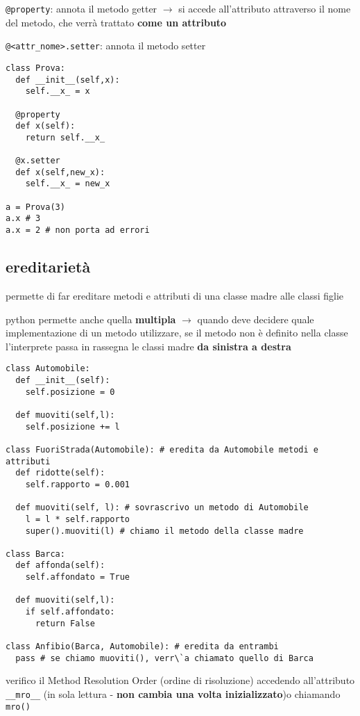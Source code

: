 \texttt{@property}: annota il metodo getter $\rightarrow$ si accede all'attributo attraverso il nome del metodo, che verr\`a trattato \textbf{come un attributo}

\texttt{@<attr_nome>.setter}: annota il metodo setter

\begin{verbatim}
class Prova:
  def __init__(self,x):
    self.__x_ = x
  
  @property
  def x(self):
    return self.__x_
  
  @x.setter
  def x(self,new_x):
    self.__x_ = new_x
    
a = Prova(3)
a.x # 3
a.x = 2 # non porta ad errori
\end{verbatim}

\subsection{ereditariet\`a}

permette di far ereditare metodi e attributi di una classe madre alle classi figlie

python permette anche quella \textbf{multipla} $\rightarrow$ quando deve decidere quale implementazione di un metodo utilizzare, se il metodo non \`e definito nella classe l'interprete passa in rassegna le classi madre \textbf{da sinistra a destra}

\begin{verbatim}
class Automobile:
  def __init__(self):
    self.posizione = 0
  
  def muoviti(self,l):
    self.posizione += l

class FuoriStrada(Automobile): # eredita da Automobile metodi e attributi
  def ridotte(self):
    self.rapporto = 0.001
  
  def muoviti(self, l): # sovrascrivo un metodo di Automobile
    l = l * self.rapporto
    super().muoviti(l) # chiamo il metodo della classe madre
    
class Barca:
  def affonda(self):
    self.affondato = True
  
  def muoviti(self,l):
    if self.affondato:
      return False
    
class Anfibio(Barca, Automobile): # eredita da entrambi
  pass # se chiamo muoviti(), verr\`a chiamato quello di Barca
\end{verbatim}

verifico il Method Resolution Order (ordine di risoluzione) accedendo all'attributo \texttt{__mro__} (in sola lettura - \textbf{non cambia una volta inizializzato})o chiamando \texttt{mro()}

